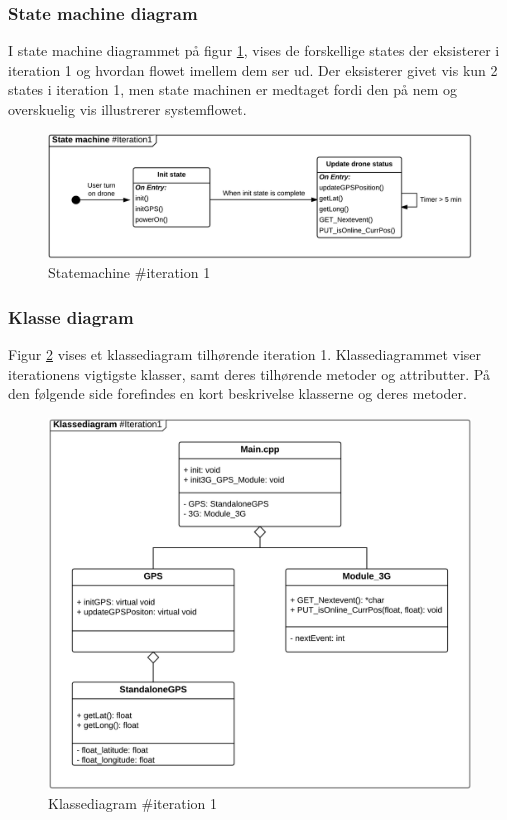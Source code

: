 \subsubsection*{State machine diagram}
\vspace{-0.1cm}
I state machine diagrammet på figur \ref{fig:Statemachine_iteration1}, vises de forskellige states der eksisterer i iteration 1 og hvordan flowet imellem dem ser ud. Der eksisterer givet vis kun 2 states i iteration 1, men state machinen er medtaget fordi den på nem og overskuelig vis illustrerer systemflowet.
\begin{figure}[H]
	\centering
	\includegraphics[width=1\textwidth]{Billeder/statemachine/State_iteration1.png}
	\vspace{-0.5cm}
	\caption{Statemachine \#iteration 1}
	\label{fig:Statemachine_iteration1}
\end{figure}
\newpage

\subsubsection*{Klasse diagram}
\vspace{-0.1cm}
Figur \ref{fig:classDiagram_iteration1} vises et klassediagram tilhørende iteration 1. Klassediagrammet viser iterationens vigtigste klasser, samt deres tilhørende metoder og attributter. På den følgende side forefindes en kort beskrivelse klasserne og deres metoder.
\begin{figure}[H]
	\centering
	\includegraphics[width=1\textwidth]{Billeder/klasse_diagrammer/classdiagram_iteration1.png}
	\vspace{-0.5cm}
	\caption{Klassediagram \#iteration 1}
	\label{fig:classDiagram_iteration1}
\end{figure}

